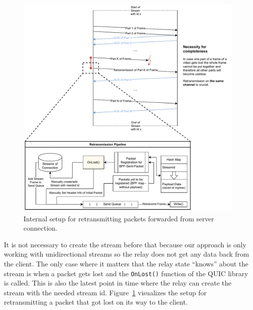 \begin{figure}[H]
    \centering
    \includegraphics[width=\textwidth]{figures/03_fast_relays/retransmission.drawio.pdf}
    \caption[Packet retransmission schematic]{Internal setup for retransmitting packets forwarded from server connection.}\label{fig:packet-retransmission}
\end{figure}

It is not necessary to create the stream before that because our approach is only working with 
unidirectional streams so the relay does not get any data back from the client.
The only case where it matters that the relay state ``knows'' about the stream is when a packet
gets lost and the \verb|OnLost()| function of the QUIC library is called.
This is also the latest point in time where the relay can create the stream with the needed stream id.
Figure~\ref{fig:packet-retransmission} visualizes the setup for retransmitting a packet that 
got lost on its way to the client. 